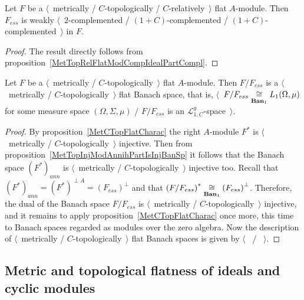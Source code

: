 \begin{corollary}\label{MetTopRelFlatModPartCompl} Let $F$ 
be a $\langle$~metrically / $C$-topologically / $C$-relatively~$\rangle$ 
flat $A$-module. Then $F_{ess}$ 
is weakly $\langle$~$2$-complemented / $(1+C)$-complemented / 
$(1+C)$-complemented~$\rangle$ in $F$.
\end{corollary}
\begin{proof} The result directly follows from 
proposition~\ref{MetTopRelFlatModCompIdealPartCompl}.
\end{proof}

\begin{proposition}\label{MetTopFlatModEssQuotIsFlatBanSp} Let $F$ be a
$\langle$~metrically / $C$-topologically~$\rangle$ flat $A$-module. Then
$F/F_{ess}$ is a $\langle$~metrically / $C$-topologically~$\rangle$ flat Banach
space, that is, $\langle$~$F/F_{ess}\mathrel{\mathop{\cong}\limits_{\mathbf{Ban}_1}}L_1(\Omega,\mu)$ for
some measure space $(\Omega, \Sigma, \mu)$ / $F/F_{ess}$ is an
$\mathscr{L}_{1,C}^g$-space~$\rangle$.
\end{proposition}
\begin{proof} By proposition~\ref{MetCTopFlatCharac} the right $A$-module $F^*$
is $\langle$~metrically / $C$-topologically~$\rangle$ injective. Then from
proposition~\ref{MetTopInjModAnnihPartIsInjBanSp} it follows that the Banach
space ${(F^*)}_{ann}$ is $\langle$~metrically / $C$-topologically~$\rangle$
injective too. Recall that
${(F^*)}_{ann}={(F^*)}^{\perp A}={(F_{ess})}^\perp$ and that
${(F/F_{ess})}^*\mathrel{\mathop{\cong}\limits_{\mathbf{Ban}_1}}{(F_{ess})}^\perp$. Therefore, the dual
of the Banach space $F/F_{ess}$ is $\langle$~metrically /
$C$-topologically~$\rangle$ injective, and it remains to apply
proposition~\ref{MetCTopFlatCharac} once more, this time to Banach spaces
regarded as modules over the zero algebra. Now the description of
$\langle$~metrically / $C$-topologically~$\rangle$ flat Banach spaces is given
by $\langle$~\cite[theorem 1]{GrothMetrProjFlatBanSp} /
\cite[corollary 23.5(1)]{DefFloTensNorOpId}~$\rangle$.
\end{proof}


\subsection{
    Metric and topological flatness of ideals and cyclic modules}\label{
SubSectionMetricAndTopologicalFlatnessOfIdealsAndCyclicModules}

